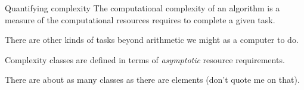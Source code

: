 \documentclass[10pt]{beamer}
\begin{document}




\begin{frame}{Quantifying complexity}
    The computational complexity of an algorithm is a measure of the computational resources requires to complete a given task.
    
    There are other kinds of tasks beyond arithmetic we might as a computer to do.

Complexity classes are defined in terms of \emph{asymptotic} resource requirements.

There are about as many classes as there are elements (don't quote me on that).
\end{frame}
\end{document}
